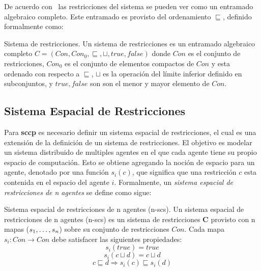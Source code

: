De acuerdo con~\cite{DEBOER199537} las restricciones del sistema se pueden ver como un entramado algebraico completo. Este entramado es provisto del ordenamiento $\sqsubseteq$, definido formalmente como:

\theoremstyle{definition}
\begin{definition}{Sistema de restricciones.}
Un sistema de restricciones es un entramado algebraico completo $C = (Con, Con_0, \sqsubseteq, \sqcup, true, false)$ donde $Con$ es el conjunto de restricciones, $Con_0$ es el conjunto de elementos compactos de $Con$ y esta ordenado con respecto a $\sqsubseteq$, $\sqcup$ es la operaci\'on del l\'imite inferior definido en subconjuntos, y $true, false$ son son el menor y mayor elemento de $Con$.
\end{definition}

\subsection{Sistema Espacial de Restricciones}
\label{ser.cap3}

Para \textbf{sccp} es necesario definir un sistema espacial de restricciones, el cual es una extensi\'on de la definici\'on de un sistema de restricciones. El objetivo es modelar un sistema distribuido de multiples agentes en el que cada agente tiene su propio espacio de computaci\'on. Esto se obtiene agregando la noci\'on de espacio para un agente, denotado por una funci\'on $s_i(c)$, que significa que una restricci\'on $c$ esta contenida en el espacio del agente $i$. Formalmente, un \textit{sistema espacial de restricciones de n agentes} se define como sigue:

\theoremstyle{definition}
\begin{definition}{Sistema espacial de restricciones de n agentes (n-scs).}
Un sistema espacial de restricciones de n agentes (n-scs) es un sistema de restricciones \textbf{C} provisto con n mapas ($s_1, \mathellipsis,s_n$) sobre su conjunto de restricciones $Con$.  Cada mapa $s_i: Con \rightarrow Con$ debe satisfacer las siguientes propiedades:
\begin{equation} \label{n-scs.eq1}	
s_i(true)=true 
\end{equation}
\begin{equation} \label{n-scs.eq2}
s_i(c\sqcup d)=c\sqcup d
\end{equation}
\begin{equation} \label{n-scs.eq3}
c \sqsubseteq d \Rightarrow s_i(c) \sqsubseteq s_i(d)
\end{equation}
\end{definition}


